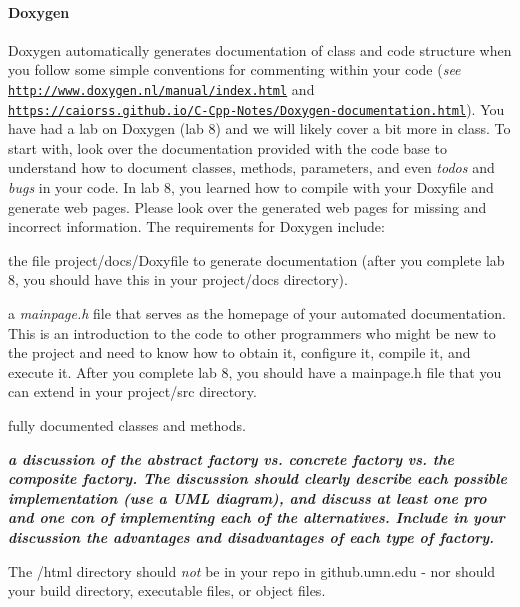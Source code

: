 \paragraph*{Doxygen}

Doxygen automatically generates documentation of class and code structure when you follow some simple conventions for commenting within your code ({\itshape see} \href{http://www.doxygen.nl/manual/index.html}{\tt http\+://www.\+doxygen.\+nl/manual/index.\+html} and \href{https://caiorss.github.io/C-Cpp-Notes/Doxygen-documentation.html}{\tt https\+://caiorss.\+github.\+io/\+C-\/\+Cpp-\/\+Notes/\+Doxygen-\/documentation.\+html}). You have had a lab on Doxygen (lab 8) and we will likely cover a bit more in class. To start with, look over the documentation provided with the code base to understand how to document classes, methods, parameters, and even {\itshape todo\textquotesingle{}s} and {\itshape bugs} in your code. In lab 8, you learned how to compile with your Doxyfile and generate web pages. Please look over the generated web pages for missing and incorrect information. The requirements for Doxygen include\+:


\begin{DoxyItemize}
\item the file {\ttfamily project/docs/\+Doxyfile} to generate documentation (after you complete lab 8, you should have this in your {\ttfamily project/docs} directory).
\item a {\itshape mainpage.\+h} file that serves as the homepage of your automated documentation. This is an introduction to the code to other programmers who might be new to the project and need to know how to obtain it, configure it, compile it, and execute it. After you complete lab 8, you should have a mainpage.\+h file that you can extend in your {\ttfamily project/src} directory.
\item fully documented classes and methods.
\item {\itshape {\bfseries a discussion of the abstract factory vs. concrete factory vs. the composite factory. The discussion should clearly describe each possible implementation (use a U\+ML diagram), and discuss at least one pro and one con of implementing each of the alternatives. Include in your discussion the advantages and disadvantages of each type of factory.}}
\item The /html directory should {\itshape not} be in your repo in github.\+umn.\+edu -\/ nor should your build directory, executable files, or object files.
\end{DoxyItemize}

